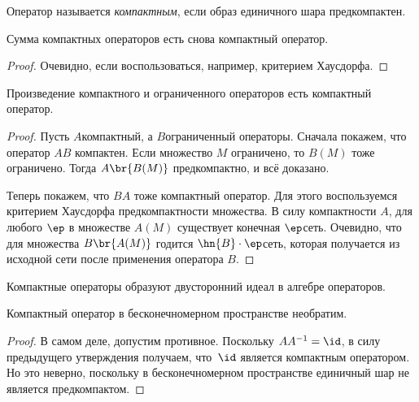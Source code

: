 \documentclass[a4paper]{article}
\begin{document}
\begin{df}
Оператор называется \emph{компактным}, если образ единичного шара предкомпактен.
\end{df}

\begin{stm}
Сумма компактных операторов есть снова компактный оператор.
\end{stm}
\begin{proof}
Очевидно, если воспользоваться, например, критерием Хаусдорфа.
\end{proof}

\begin{stm}\label{CompactIdeal}
Произведение компактного и ограниченного операторов есть компактный оператор.
\end{stm}
\begin{proof}
Пусть $A$\т компактный, а $B$\т ограниченный операторы. Сначала покажем,
что оператор $AB$ компактен. Если множество $M$ ограничено, то $B(M)$ тоже ограничено.
Тогда $A\br{B(M)}$ предкомпактно, и всё доказано.

Теперь покажем, что $BA$ тоже компактный оператор. Для этого воспользуемся критерием Хаусдорфа
предкомпактности множества. В силу компактности $A$, для любого $\ep$ в множестве
$A(M)$ существует конечная $\ep$\д сеть. Очевидно, что для множества $B\br{A(M)}$ годится
$\hn{B}\cdot \ep$\д сеть, которая получается из исходной сети после применения оператора $B$.
\end{proof}

\begin{imp}
Компактные операторы образуют двусторонний идеал в алгебре операторов.
\end{imp}

\begin{imp}
Компактный оператор в бесконечномерном пространстве необратим.
\end{imp}
\begin{proof}
В самом деле, допустим противное. Поскольку $AA^{-1} = \id$, в силу предыдущего
утверждения получаем, что~$\id$ является компактным оператором. Но это неверно,
поскольку в бесконечномерном пространстве единичный шар не является предкомпактом.
\end{proof}
\end{document}
